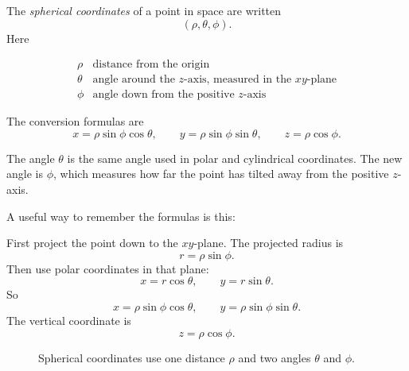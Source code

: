 \begin{definition}
The \emph{spherical coordinates} of a point in space are written
\[
    (\rho,\theta,\phi).
\]
Here

\[
\begin{array}{c|c}
\rho & \text{distance from the origin}\\
\theta & \text{angle around the }z\text{-axis, measured in the }xy\text{-plane}\\
\phi & \text{angle down from the positive }z\text{-axis}
\end{array}
\]

The conversion formulas are
\[
\boxed{
    x=\rho\sin\phi\cos\theta,\qquad
    y=\rho\sin\phi\sin\theta,\qquad
    z=\rho\cos\phi.
}
\]
\end{definition}

The angle \(\theta\) is the same angle used in polar and cylindrical coordinates.  The new
angle is \(\phi\), which measures how far the point has tilted away from the positive
\(z\)-axis.

A useful way to remember the formulas is this:

First project the point down to the \(xy\)-plane.  The projected radius is
\[
    r=\rho\sin\phi.
\]
Then use polar coordinates in that plane:
\[
    x=r\cos\theta,
    \qquad
    y=r\sin\theta.
\]
So
\[
    x=\rho\sin\phi\cos\theta,
    \qquad
    y=\rho\sin\phi\sin\theta.
\]
The vertical coordinate is
\[
    z=\rho\cos\phi.
\]

\begin{figure}[h]
\centering
{}
\caption{Spherical coordinates use one distance \(\rho\) and two angles \(\theta\) and
\(\phi\).}
\end{figure}

